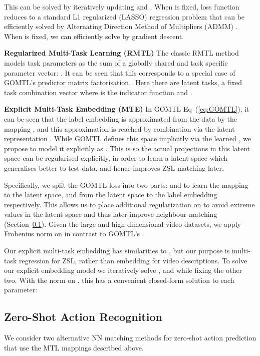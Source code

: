 \documentclass[runningheads]{llncs}
\begin{document}
This  can be solved by iteratively updating  and . When  is fixed, loss function reduces to
 a standard L1 regularized (LASSO) regression  problem that can be efficiently solved by Alternating Direction Method of Multipliers (ADMM) \cite{boyd2011distributed}.
When  is fixed, we can efficiently solve  by gradient descent. 





\noindent\textbf{Regularized Multi-Task Learning (RMTL)} \quad
The classic RMTL method \cite{Evgeniou2004} models task parameters as
the sum of a globally shared and task specific parameter vector:
. It can be seen that this
corresponds to a special case of GOMTL's  predictor matrix
factorisation \cite{Yang2015}. Here there are   latent tasks, a fixed
task combination vector 
where  is the indicator function and . 


\noindent\textbf{Explicit Multi-Task Embedding (MTE)}\quad
In GOMTL Eq~(\ref{eq:GOMTL}), it can be seen that the label embedding
 is approximated from the data by the mapping
, and this approximation is reached by
combination via the latent representation . While GOMTL defines
this space implicitly via the learned , we propose to model it
explicitly as . This is so the
actual projections  in this latent space can be
regularised explicitly, in order to learn a latent space which
generalises better to test data, and hence improves ZSL matching
later. 

Specifically, we split the GOMTL loss  into two parts:   and  to learn the mapping to the latent space, and from the latent space to the label embedding respectively. This allows us to place additional regularization on  to avoid extreme values in the latent space and thus later improve neighbour matching (Section~\ref{sec:NNMatching}). Given the large and high dimensional video datasets, we  apply Frobenius norm on   in contrast to GOMTL's .



\noindent Our explicit multi-task embedding has similarities to
\cite{Habibian2014}, but our purpose is multi-task regression for ZSL,
rather than embedding for video descriptions. To solve our explicit
embedding model we iteratively solve , and  while fixing the
other two. With the  norm on , this has a convenient
closed-form solution to each parameter: 


\textcolor{black}{}

\subsection{Zero-Shot Action Recognition}\label{sec:NNMatching}
We consider two alternative NN matching
methods for zero-shot action prediction that use the MTL mappings described above. 
\end{document}
